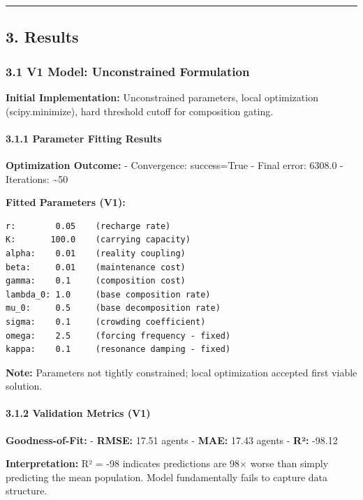 \documentclass[
]{article}
\begin{document}
\begin{center}\rule{0.5\linewidth}{0.5pt}\end{center}

\subsection{3. Results}\label{results}

\subsubsection{3.1 V1 Model: Unconstrained
Formulation}\label{v1-model-unconstrained-formulation}

\textbf{Initial Implementation:} Unconstrained parameters, local
optimization (scipy.minimize), hard threshold cutoff for composition
gating.

\paragraph{3.1.1 Parameter Fitting
Results}\label{parameter-fitting-results}

\textbf{Optimization Outcome:} - Convergence: success=True - Final
error: 6308.0 - Iterations: \textasciitilde50

\textbf{Fitted Parameters (V1):}

\begin{verbatim}
r:        0.05    (recharge rate)
K:       100.0    (carrying capacity)
alpha:    0.01    (reality coupling)
beta:     0.01    (maintenance cost)
gamma:    0.1     (composition cost)
lambda_0: 1.0     (base composition rate)
mu_0:     0.5     (base decomposition rate)
sigma:    0.1     (crowding coefficient)
omega:    2.5     (forcing frequency - fixed)
kappa:    0.1     (resonance damping - fixed)
\end{verbatim}

\textbf{Note:} Parameters not tightly constrained; local optimization
accepted first viable solution.

\paragraph{3.1.2 Validation Metrics (V1)}\label{validation-metrics-v1}

\textbf{Goodness-of-Fit:} - \textbf{RMSE:} 17.51 agents - \textbf{MAE:}
17.43 agents - \textbf{R²:} -98.12

\textbf{Interpretation:} R² = -98 indicates predictions are 98× worse
than simply predicting the mean population. Model fundamentally fails to
capture data structure.
\end{document}

